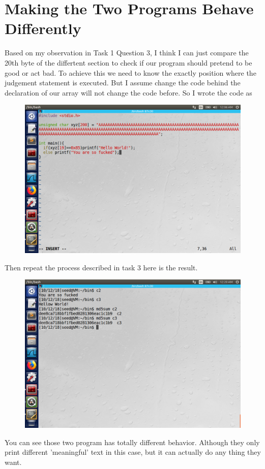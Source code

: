 \documentclass{article}
\begin{document}
\section{Making the Two Programs Behave Differently}
Based on my observation in Task 1 Question 3, I think I can just compare the 20th byte of the differtent section to check if our program should pretend to be good or act bad. To achieve this we need to know the exactly position where the judgement statement is executed. But I assume change the code behind the declaration of our array will not change the code before. So I wrote the code as
\begin{figure}[H]\centering\includegraphics[width=\textwidth]{ss/14.png}\end{figure}
Then repeat the process described in task 3 here is the result.
\begin{figure}[H]\centering\includegraphics[width=\textwidth]{ss/15.png}\end{figure}
You can see those two program has totally different behavior. Although they only print different 'meaningful' text in this case, but it can actually do any thing they want.
\end{document}
